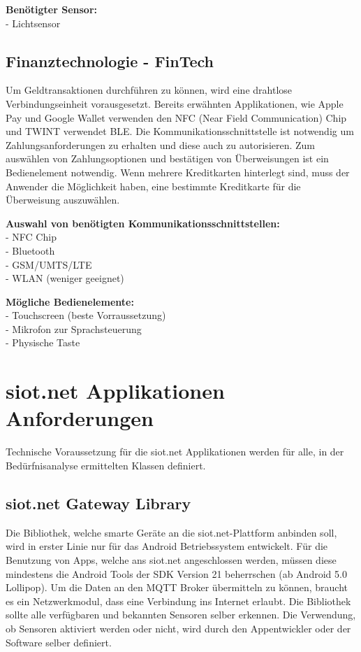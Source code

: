 \textbf{Benötigter Sensor:}\\
- Lichtsensor

\subsection{Finanztechnologie - FinTech}
Um Geldtransaktionen durchführen zu können, wird eine drahtlose Verbindungseinheit vorausgesetzt. Bereits erwähnten Applikationen, wie Apple Pay und Google Wallet verwenden den \gls{NFC} (Near Field Communication) Chip und TWINT verwendet \gls{BLE}. Die Kommunikationsschnittstelle ist notwendig um Zahlungsanforderungen zu erhalten und diese auch zu autorisieren. Zum auswählen von Zahlungsoptionen und bestätigen von Überweisungen ist ein Bedienelement notwendig. Wenn mehrere Kreditkarten hinterlegt sind, muss der Anwender die Möglichkeit haben, eine bestimmte Kreditkarte für die Überweisung auszuwählen.

\textbf{Auswahl von benötigten Kommunikationsschnittstellen:}\\
- \gls{NFC} Chip\\
- Bluetooth\\
- \gls{GSM}/\gls{UMTS}/\gls{LTE}\\
- \gls{WLAN} (weniger geeignet)

\textbf{Mögliche Bedienelemente:}\\
- Touchscreen (beste Vorraussetzung)\\
- Mikrofon zur Sprachsteuerung\\
- Physische Taste

\section{siot.net Applikationen Anforderungen}
Technische Voraussetzung für die siot.net Applikationen werden für alle, in der Bedürfnisanalyse ermittelten Klassen definiert.

\subsection{siot.net Gateway Library}
Die Bibliothek, welche smarte Geräte an die siot.net-Plattform anbinden soll, wird in erster Linie nur für das Android Betriebssystem entwickelt. Für die Benutzung von Apps, welche ans siot.net angeschlossen werden, müssen diese mindestens die Android Tools der \gls{SDK} Version 21 beherrschen (ab Android 5.0 Lollipop). Um die Daten an den \gls{MQTT} Broker übermitteln zu können, braucht es ein Netzwerkmodul, dass eine Verbindung ins Internet erlaubt. Die Bibliothek sollte alle verfügbaren und bekannten Sensoren selber erkennen. Die Verwendung, ob Sensoren aktiviert werden oder nicht, wird durch den Appentwickler oder der Software selber definiert.


